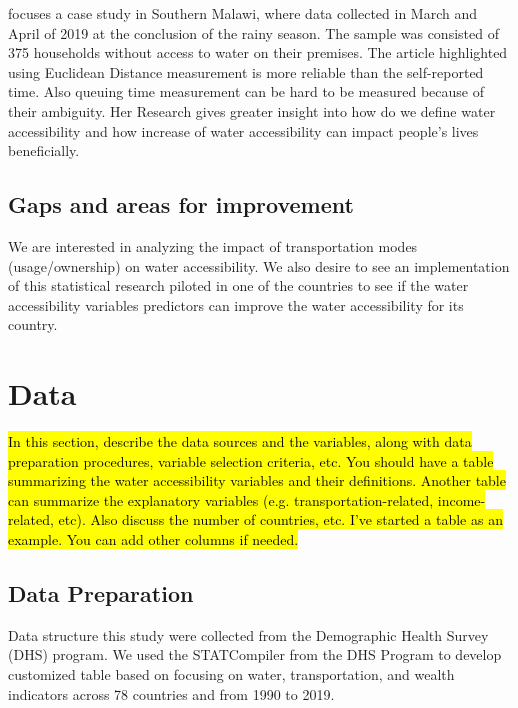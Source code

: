 \documentclass[10pt,twoside]{article}
\numberwithin{equation}{section}
\newcommand{\?}{\stackrel{?}{=}}
\begin{document}
\citet{cassivi2021evaluating} focuses a case study in Southern Malawi, where data collected in March and April of 2019 at the conclusion of the rainy season. The sample was consisted of 375 households without access to water on their premises.   The article highlighted using Euclidean Distance measurement is more reliable than the self-reported time. Also queuing time measurement can be hard to be measured because of their ambiguity. Her Research gives greater insight into how do we define water accessibility and how increase of water accessibility can impact people's lives beneficially. 


\subsection*{Gaps and areas for improvement}
We are interested in analyzing the impact of transportation modes (usage/ownership) on water accessibility. We also desire to see an implementation of this statistical research piloted in one of the countries to see if the water accessibility variables predictors can improve the water accessibility for its country. 

\eject

\section*{Data}
\hl{In this section, describe the data sources and the variables, along with data preparation procedures, variable
  selection criteria, etc. You should have a table summarizing the water accessibility variables and their
  definitions. Another table can summarize the explanatory variables (e.g. transportation-related, income-related,
  etc). Also discuss the number of countries, etc. I've started a table as an example. You can add other columns if needed.}
\subsection*{Data Preparation}
Data structure this study were collected from the Demographic Health Survey (DHS) program. We used the STATCompiler from the DHS Program to develop customized table based on focusing on water, transportation, and wealth indicators across 78 countries and from 1990 to 2019.
\end{document}
